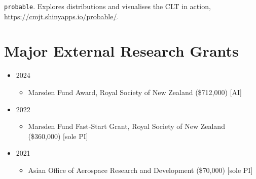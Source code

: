 \documentclass[10pt,a4paper]{moderncv}
\begin{document}
\texttt{probable}. Explores distributions and visualises the CLT in action, \url{https://cmjt.shinyapps.io/probable/}.\\

\section{Major External Research Grants}

\vspace{6pt}
\begin{itemize}
  \item 2024
  \begin{itemize}
  \item Marsden Fund Award, Royal Society of New Zealand (\$712,000) [AI]
  \end{itemize}
\item 2022
  \begin{itemize}
  \item Marsden Fund Fast-Start Grant, Royal Society of New Zealand (\$360,000) [sole PI]
  \end{itemize}
\item 2021
  \begin{itemize}
  \item Asian Office of Aerospace Research and Development (\$70,000) [sole PI]
  \end{itemize}
\end{itemize}
\end{document}
